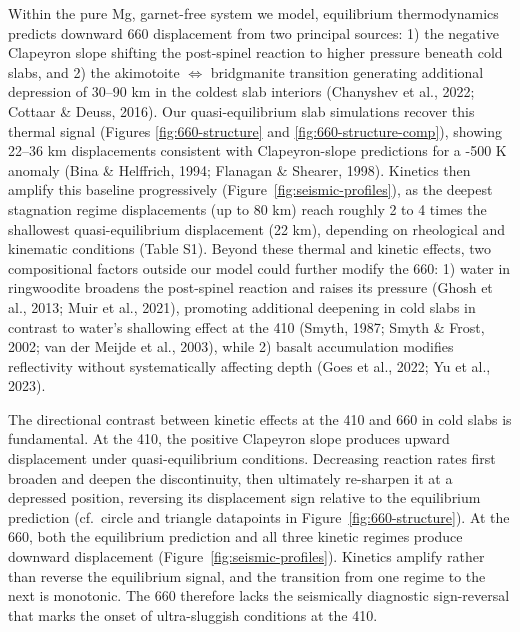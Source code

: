 \documentclass[draft,linenumbers]{agujournal2019}
\begin{document}
Within the pure Mg, garnet-free system we model, equilibrium
thermodynamics predicts downward 660 displacement from two principal
sources: 1) the negative Clapeyron slope shifting the post-spinel
reaction to higher pressure beneath cold slabs, and 2) the akimotoite
\(\Leftrightarrow\) bridgmanite transition generating additional
depression of 30--90 km in the coldest slab interiors ({Chanyshev et
al.}, 2022; Cottaar \& Deuss, 2016). Our quasi-equilibrium slab
simulations recover this thermal signal (Figures \ref{fig:660-structure}
and \ref{fig:660-structure-comp}), showing 22--36 km displacements
consistent with Clapeyron-slope predictions for a -500 K anomaly (Bina
\& Helffrich, 1994; Flanagan \& Shearer, 1998). Kinetics then amplify
this baseline progressively (Figure~\ref{fig:seismic-profiles}), as the
deepest stagnation regime displacements (up to 80 km) reach roughly 2 to
4 times the shallowest quasi-equilibrium displacement (22 km), depending
on rheological and kinematic conditions (Table S1). Beyond these thermal
and kinetic effects, two compositional factors outside our model could
further modify the 660: 1) water in ringwoodite broadens the post-spinel
reaction and raises its pressure (Ghosh et al., 2013; Muir et al.,
2021), promoting additional deepening in cold slabs in contrast to
water's shallowing effect at the 410 (Smyth, 1987; Smyth \& Frost, 2002;
{van der Meijde et al.}, 2003), while 2) basalt accumulation modifies
reflectivity without systematically affecting depth ({Goes et al.},
2022; {Yu et al.}, 2023).

The directional contrast between kinetic effects at the 410 and 660 in
cold slabs is fundamental. At the 410, the positive Clapeyron slope
produces upward displacement under quasi-equilibrium conditions.
Decreasing reaction rates first broaden and deepen the discontinuity,
then ultimately re-sharpen it at a depressed position, reversing its
displacement sign relative to the equilibrium prediction (cf.~circle and
triangle datapoints in Figure~\ref{fig:660-structure}). At the 660, both
the equilibrium prediction and all three kinetic regimes produce
downward displacement (Figure~\ref{fig:seismic-profiles}). Kinetics
amplify rather than reverse the equilibrium signal, and the transition
from one regime to the next is monotonic. The 660 therefore lacks the
seismically diagnostic sign-reversal that marks the onset of
ultra-sluggish conditions at the 410.
\end{document}
